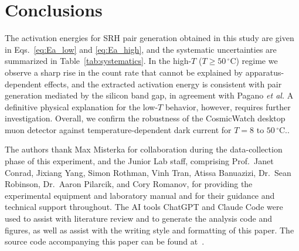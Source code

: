\documentclass[aps,twocolumn,secnumarabic,balancelastpage,amsmath,amssymb,nofootinbib,floatfix]{revtex4-1}
\begin{document}
\section{Conclusions}

The activation energies for SRH pair generation obtained in this study are given in Eqs.~\eqref{eq:Ea_low} and \eqref{eq:Ea_high}, and the systematic uncertainties are summarized in Table~\ref{tab:systematics}. In the high-$T$ ($T \geq 50\,^{\circ}\text{C}$) regime we observe a sharp rise in the count rate that cannot be explained by apparatus-dependent effects, and the extracted activation energy is consistent with pair generation mediated by the silicon band gap, in agreement with Pagano \emph{et al.} A definitive physical explanation for the low-$T$ behavior, however, requires further investigation. Overall, we confirm the robustness of the CosmicWatch desktop muon detector against temperature-dependent dark current for $T = 8$ to $50\,^{\circ}\text{C}$..


\begin{acknowledgments}
The authors thank Max Misterka for collaboration during the data-collection phase of this experiment, and the Junior Lab staff, comprising Prof.\ Janet Conrad, Jixiang Yang, Simon Rothman, Vinh Tran, Atissa Banuazizi, Dr.\ Sean Robinson, Dr.\ Aaron Pilarcik, and Cory Romanov, for providing the experimental equipment and laboratory manual and for their guidance and technical support throughout. The AI tools ChatGPT and Claude Code were used to assist with literature review and to generate the analysis code and figures, as well as assist with the writing style and formatting of this paper. The source code accompanying this paper can be found at~\cite{suresh_sipm_jlab}.
\end{acknowledgments}




\clearpage
\end{document}
